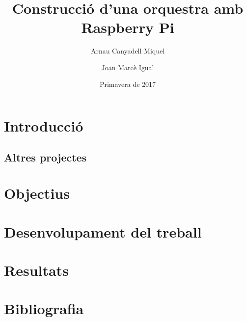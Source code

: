 \documentclass[a4paper]{article}
\title{Construcció d'una orquestra amb Raspberry Pi}
\author{Arnau Canyadell Miquel \and Joan Marcè Igual}
\date{Primavera de 2017}
\begin{document}
\begin{titlepage}
	\maketitle
\end{titlepage}

\tableofcontents

\newpage

\section{Introducció}

\subsection{Altres projectes}

\section{Objectius}

\section{Desenvolupament del treball}

\section{Resultats}

\section{Bibliografia}
\end{document}
